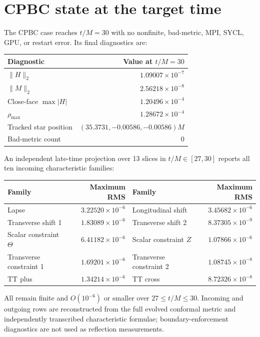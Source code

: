 \documentclass[11pt]{article}
\begin{document}
\section{CPBC state at the target time}

The CPBC case reaches $t/M=30$ with no nonfinite, bad-metric, MPI, SYCL,
GPU, or restart error.  Its final diagnostics are:
\begin{center}
\begin{tabular}{lr}
\toprule
Diagnostic & Value at $t/M=30$ \\
\midrule
$\|H\|_2$ & $1.09007\times10^{-7}$ \\
$\|M\|_2$ & $2.56218\times10^{-8}$ \\
Close-face $\max|H|$ & $1.20496\times10^{-4}$ \\
$\rho_{\max}$ & $1.28672\times10^{-4}$ \\
Tracked star position & $(35.3731,-0.00586,-0.00586)M$ \\
Bad-metric count & 0 \\
\bottomrule
\end{tabular}
\end{center}

An independent late-time projection over 13 slices in $t/M\in[27,30]$
reports all ten incoming characteristic families:
\begin{center}
\begin{tabular}{lr@{\qquad}lr}
\toprule
Family & Maximum RMS & Family & Maximum RMS \\
\midrule
Lapse & $3.22520\times10^{-6}$ &
Longitudinal shift & $3.45682\times10^{-6}$ \\
Transverse shift 1 & $1.83089\times10^{-6}$ &
Transverse shift 2 & $8.37305\times10^{-9}$ \\
Scalar constraint $\Theta$ & $6.41182\times10^{-6}$ &
Scalar constraint $Z$ & $1.07866\times10^{-6}$ \\
Transverse constraint 1 & $1.69201\times10^{-6}$ &
Transverse constraint 2 & $1.08745\times10^{-8}$ \\
TT plus & $1.34214\times10^{-6}$ &
TT cross & $8.72326\times10^{-8}$ \\
\bottomrule
\end{tabular}
\end{center}
All remain finite and $O(10^{-6})$ or smaller over
$27\leq t/M\leq30$.  Incoming and outgoing rows are reconstructed from the
full evolved conformal metric and independently transcribed characteristic
formulae; boundary-enforcement diagnostics are not used as reflection
measurements.
\end{document}
